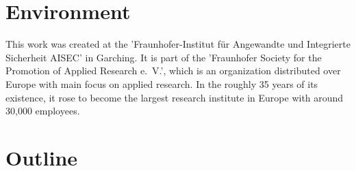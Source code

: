 

\section{Environment}

This work was created at the 'Fraunhofer-Institut für Angewandte und Integrierte Sicherheit AISEC' in Garching.
It is part of the 'Fraunhofer Society for the Promotion of Applied Research e.~V.', which is an organization distributed over Europe with main focus on applied research.
In the roughly 35 years of its existence, it rose to become the largest research institute in Europe with around 30,000 employees.

\section{Outline}

